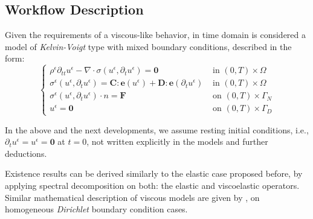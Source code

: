 \subsection{Workflow Description}
Given the requirements of a viscous-like behavior, in time domain is considered a model of \textit{Kelvin-Voigt} type with mixed boundary conditions, described in the form:
\begin{equation*}
    \left \{
    \begin{array}{cc}
        \rho^{\epsilon}\partial_{tt}u^{\epsilon} - \nabla \cdot \sigma(u^{\epsilon}, \partial_t u^{\epsilon}) = \mathbf{0} & \text{ in } (0,T) \times \Omega\\
        \sigma^{\epsilon}(u^{\epsilon},\partial_t u^{\epsilon})  = \mathbf{C}:\mathbf{e}(u^{\epsilon}) + \mathbf{D}:\mathbf{e}(\partial_t u^{\epsilon}) & \text{ in } (0,T) \times \Omega\\
        \sigma^{\epsilon}(u^{\epsilon}, \partial_t u^{\epsilon})\cdot n = \mathbf{F} & \text{ on } (0,T) \times \Gamma_N\\ 
        u^{\epsilon} = \mathbf{0} & \text{ on } (0,T) \times \Gamma_D
    \end{array}
    \right .
    \label{ViscoElasticModel}
\end{equation*}
\begin{rem}
In the above and the next developments, we assume resting initial conditions, i.e., $\partial_t u^{\epsilon} = u^{\epsilon} = \mathbf{0}$ at $t = 0$, not written explicitly in the models and further deductions.
\end{rem}
Existence results can be derived similarly to the elastic case proposed before, by applying spectral decomposition on both: the elastic and viscoelastic operators. Similar mathematical description of viscous models are given by \cite{Abdessamad2009}, \cite{Boughammoura2013} on homogeneous \textit{Dirichlet} boundary condition cases.

